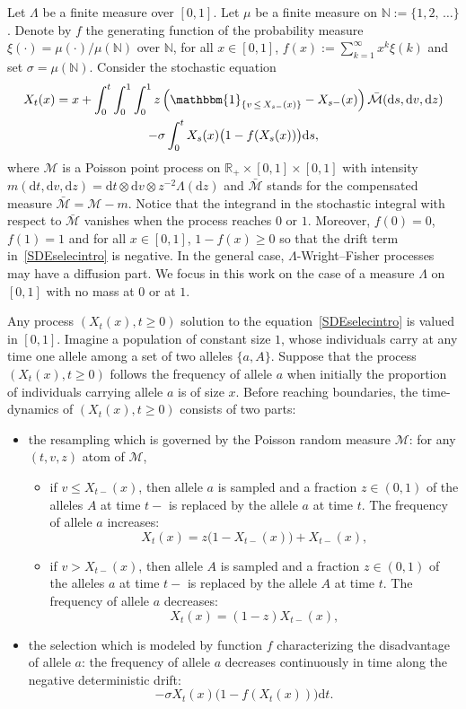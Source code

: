 \documentclass[10pt]{amsart}
\theoremstyle{definition}\newtheorem{defi}[theo]{Definition}\newtheorem{rema}[theo]{Remark}\newtheorem{exam}[theo]{Example}\newtheorem{exem}[theo]{Example}\newtheorem{nota}[theo]{Notation}
\newcommand{\ddr}{\mathrm{d}}
\newcommand{\bbmun}{\mathbbm{1}}
\newcommand{\bbN}{\mathbb{N}}
\newcommand{\bbR}{\mathbb{R}}
\newcommand{\clM}{\mathcal{M}}
\begin{document}
Let $\Lambda$ be a finite measure over $[0,1]$. Let $\mu$ be a finite measure on $\bbN:=\{1,2,\,\ldots\}$. Denote by $f$ the generating function of the probability measure $\xi(\cdot)=\mu(\cdot)/\mu(\bbN)$ over $\bbN$, for all $x\in [0,1]$, $f(x):=\sum_{k=1}^{\infty}x^{k}\xi(k)$ and set $\sigma=\mu(\bbN)$. Consider the stochastic equation
\begin{multline}\label{SDEselecintro}
X_t(x)=x+\int_{0}^{t}\int_{0}^{1}\int_{0}^{1}z\left(\bbmun_{\{v\,\leq\,X_{s-}(x)\}}-X_{s-}(x)\right)\bar{\clM}(\ddr s,\ddr v, \ddr z)\\
-\sigma \int_{0}^{t}X_{s}(x)\big(1-f(X_{s}(x))\big)\ddr s,
\end{multline}
where $\clM$ is a Poisson point process on $\bbR_+\times [0,1]\times [0,1]$ with intensity $m(\ddr t,\ddr v, \ddr z)=\ddr t\otimes \ddr v\otimes z^{-2}\Lambda(\ddr z)$ and $\bar{\clM}$ stands for the compensated measure $\bar{\clM}=\clM-m$. Notice that the integrand in the stochastic integral with respect to $\bar{\clM}$ vanishes when the process reaches $0$ or $1$. Moreover, $f(0)=0$, $f(1)=1$ and for all $x\in [0,1]$, $1-f(x)\geq 0$ so that the drift term in~\eqref{SDEselecintro} is negative. In the general case, $\Lambda$-Wright--Fisher processes may have a diffusion part. We focus in this work on the case of a measure $\Lambda$ on $[0,1]$ with no mass at $0$ or at $1$.

Any process $(X_t(x),t\geq 0)$ solution to the equation~\eqref{SDEselecintro} is valued in $[0,1]$. Imagine a population of constant size $1$, whose individuals carry at any time one allele among a set of two alleles $\{a,A\}$. Suppose that the process $(X_t(x),t\geq 0)$ follows the frequency of allele $a$ when initially the proportion of individuals carrying allele $a$ is of size $x$. Before reaching boundaries, the time-dynamics of $(X_t(x),t\geq 0)$ consists of two parts:
\begin{itemize}
\item the resampling which is governed by the Poisson random measure $\clM$: for any $(t,v,z)$ atom of $\clM$,
\begin{itemize}
\item if $v\leq X_{t-}(x)$, then allele $a$ is sampled and a fraction $z\in (0,1)$ of the alleles $A$ at time $t-$ is replaced by the allele $a$ at time $t$. The frequency of allele $a$ increases:
\[
X_t(x)=z\big(1-X_{t-}(x)\big)+X_{t-}(x),
\]

\item if $v>X_{t-}(x)$, then allele $A$ is sampled and a fraction $z\in (0,1)$ of the alleles $a$ at time $t-$ is replaced by the allele $A$ at time $t$. The frequency of allele $a$ decreases:
\[
X_t(x)=(1-z)X_{t-}(x),
\]
\end{itemize}
\item the selection which is modeled by function $f$ characterizing the disadvantage of allele $a$: the frequency of allele $a$ decreases continuously in time along the negative deterministic drift:
\[
-\sigma X_t(x)\big(1-f(X_{t}(x))\big)\ddr t.
\]
\end{itemize}
\end{document}
